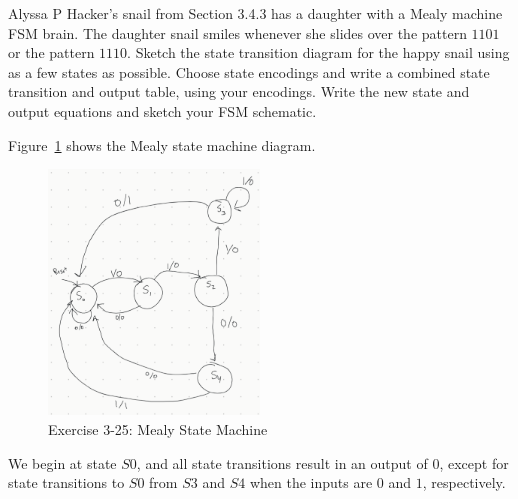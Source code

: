 \documentclass[12pt]{article}
\newenvironment{ex}[2][Exercise]{\begin{trivlist}
		\item[\hskip \labelsep {\bfseries #1}\hskip \labelsep {\bfseries #2.}]}{\end{trivlist}}
\newenvironment{sol}[1][Solution]{\begin{trivlist}
		\item[\hskip \labelsep {\bfseries #1:}]}{\end{trivlist}}
\begin{document}
\begin{ex}{3.25}
	Alyssa P Hacker's snail from Section 3.4.3 has a daughter with a Mealy machine FSM brain.
	The daughter snail smiles whenever she slides over the pattern $1101$ or the pattern $1110$.
	Sketch the state transition diagram for the happy snail using as a few states as possible.
	Choose state encodings and write a combined state transition and output table, using your
	encodings. Write the new state and output equations and sketch your FSM schematic.
\end{ex}

\begin{sol}
	Figure~\ref{03-25-mealy-state-machine} shows the Mealy state machine diagram.
	\begin{figure}
		\centering
		\includegraphics[width=0.5\textwidth]{03-25-mealy-state-machine}
		\caption{Exercise 3-25: Mealy State Machine}
		\label{03-25-mealy-state-machine}
	\end{figure}
	We begin at state $S0$, and all state transitions result in an output of $0$,
	except for state transitions to $S0$ from $S3$ and $S4$ when the inputs are
	$0$ and $1$, respectively.
\end{sol}
\end{document}
